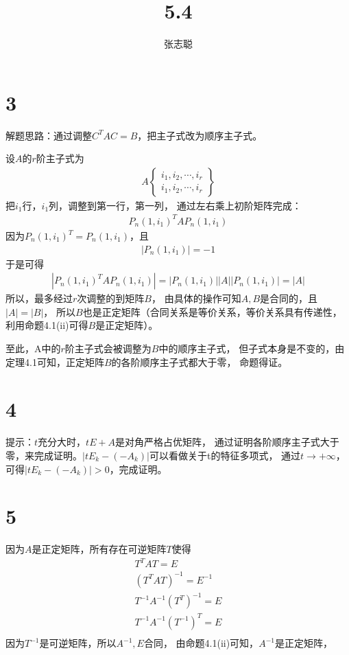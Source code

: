 \documentclass{article}
\begin{document}
\title{5.4}
\author{张志聪}
\maketitle

\section*{3}

解题思路：通过调整$C^T A C = B$，把主子式改为顺序主子式。

设$A$的$r$阶主子式为
\begin{align*}
  A
  \begin{Bmatrix}
    i_1, i_2, \cdots, i_r \\
    i_1, i_2, \cdots, i_r
  \end{Bmatrix}
\end{align*}
把$i_1$行，$i_1$列，调整到第一行，第一列，
通过左右乘上初阶矩阵完成：
\begin{align*}
  P_n(1, i_1)^T A P_n(1, i_1)
\end{align*}
因为$P_n(1, i_1)^T = P_n(1, i_1)$，且
\begin{align*}
  |P_n(1, i_1)| = - 1
\end{align*}
于是可得
\begin{align*}
  |P_n(1, i_1)^T A P_n(1, i_1)| = |P_n(1, i_1)| |A| |P_n(1, i_1)| = |A|
\end{align*}
所以，最多经过$r$次调整的到矩阵$B$，
由具体的操作可知$A, B$是合同的，且$|A| = |B|$，
所以$B$也是正定矩阵（合同关系是等价关系，等价关系具有传递性，利用命题4.1(ii)可得$B$是正定矩阵）。

至此，A中的$r$阶主子式会被调整为$B$中的顺序主子式，
但子式本身是不变的，由定理4.1可知，正定矩阵$B$的各阶顺序主子式都大于零，
命题得证。

\section*{4}

提示：$t$充分大时，$tE + A$是对角严格占优矩阵，
通过证明各阶顺序主子式大于零，来完成证明。$|tE_k - (- A_k)|$可以看做关于t的特征多项式，
通过$t \to +\infty$，可得$|tE_k - (- A_k)| > 0$，完成证明。

\section*{5}

因为$A$是正定矩阵，所有存在可逆矩阵$T$使得
\begin{align*}
  T^T A T = E                    \\
  (T^T A T)^{-1} = E^{-1}        \\
  T^{-1} A^{-1} (T^T)^{-1} = E   \\
  T^{-1} A^{-1} (T^{-1})^{T} = E \\
\end{align*}
因为$T^{-1}$是可逆矩阵，所以$A^{-1}, E$合同，
由命题4.1(ii)可知，$A^{-1}$是正定矩阵，
\end{document}

